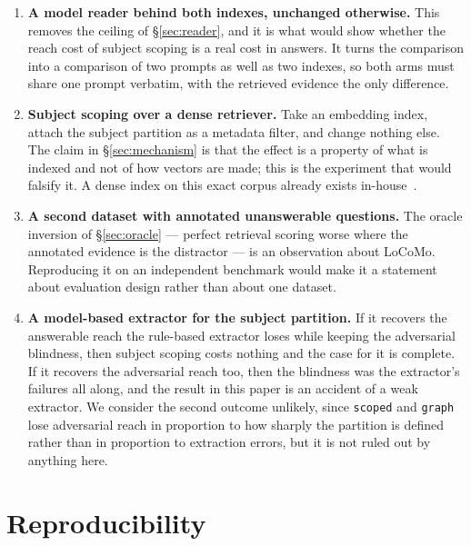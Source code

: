 \documentclass[11pt]{article}
\newcommand{\arm}[1]{\texttt{#1}}
\begin{document}
\begin{enumerate}[leftmargin=1.4em,itemsep=3pt]
\item \textbf{A model reader behind both indexes, unchanged otherwise.} This
      removes the ceiling of \S\ref{sec:reader}, and it is what would show
      whether the reach cost of subject scoping is a real cost in answers. It
      turns the comparison into a comparison of two prompts as well as two
      indexes, so both arms must share one prompt verbatim, with the retrieved
      evidence the only difference.

\item \textbf{Subject scoping over a dense retriever.} Take an embedding index,
      attach the subject partition as a metadata filter, and change nothing
      else. The claim in \S\ref{sec:mechanism} is that the effect is a property
      of what is indexed and not of how vectors are made; this is the experiment
      that would falsify it. A dense index on this exact corpus already exists
      in-house~\cite{multihop}.

\item \textbf{A second dataset with annotated unanswerable questions.} The
      oracle inversion of \S\ref{sec:oracle} --- perfect retrieval scoring worse
      where the annotated evidence is the distractor --- is an observation about
      LoCoMo. Reproducing it on an independent benchmark would make it a
      statement about evaluation design rather than about one dataset.

\item \textbf{A model-based extractor for the subject partition.} If it recovers
      the answerable reach the rule-based extractor loses while keeping the
      adversarial blindness, then subject scoping costs nothing and the case for
      it is complete. If it recovers the adversarial reach too, then the
      blindness was the extractor's failures all along, and the result in this
      paper is an accident of a weak extractor. We consider the second outcome
      unlikely, since \arm{scoped} and \arm{graph} lose adversarial reach in
      proportion to how sharply the partition is defined rather than in
      proportion to extraction errors, but it is not ruled out by anything here.
\end{enumerate}

\section{Reproducibility}
\label{sec:repro}
\end{document}

